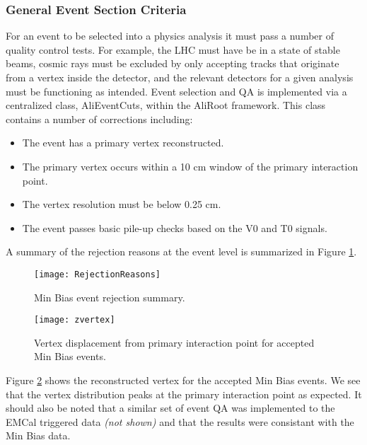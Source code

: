 \subsubsection{General Event Section Criteria}
For an event to be selected into a physics analysis it must pass a number of quality control tests.  For example, the LHC must have be in a state of stable beams, cosmic rays must be excluded by only accepting tracks that originate from a vertex inside the detector, and the relevant detectors for a given analysis must be functioning as intended.  Event selection and QA is implemented via a centralized class, AliEventCuts, within the AliRoot framework.  This class contains a number of corrections including:

\begin{itemize}
  \item The event has a primary vertex reconstructed.
  \item The primary vertex occurs within a 10 cm window of the primary interaction point.
  \item The vertex resolution must be below 0.25 cm.
  \item The event passes basic pile-up checks based on the V0 and T0 signals.
\end{itemize}

\noindent
A summary of the rejection reasons at the event level is summarized in Figure \ref{fig:eventqa}.

\begin{figure}[h]
\texttt{[image: RejectionReasons]}
\centering
\caption{Min Bias event rejection summary.}
\label{fig:eventqa}
\end{figure}

\begin{figure}[h]
\texttt{[image: zvertex]}
\centering
\caption{Vertex displacement from primary interaction point for accepted Min Bias events.}
\label{fig:vertrec}
\end{figure}

\noindent 
Figure \ref{fig:vertrec} shows the reconstructed vertex for the accepted Min Bias events.  We see that the vertex distribution peaks at the primary interaction point as expected.  It should also be noted that a similar set of event QA was implemented to the EMCal triggered data \textit{(not shown)} and that the results were consistant with the Min Bias data.

